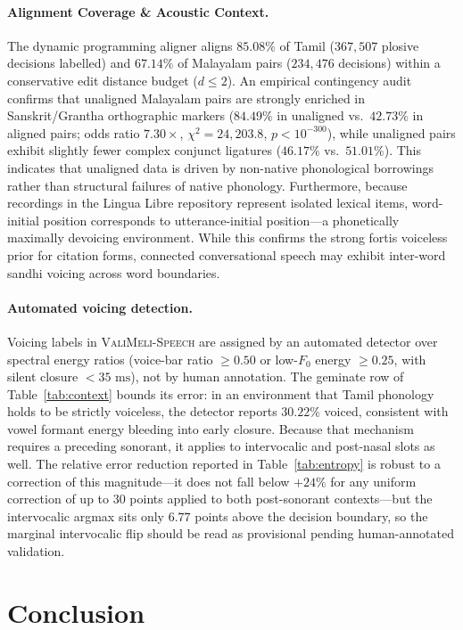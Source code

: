\documentclass[11pt]{article}
\begin{document}
\paragraph{Alignment Coverage \& Acoustic Context.} The dynamic programming aligner aligns $85.08\%$ of Tamil ($367{,}507$ plosive decisions labelled) and $67.14\%$ of Malayalam pairs ($234{,}476$ decisions) within a conservative edit distance budget ($d \le 2$). An empirical contingency audit confirms that unaligned Malayalam pairs are strongly enriched in Sanskrit/Grantha orthographic markers ($84.49\%$ in unaligned vs.\ $42.73\%$ in aligned pairs; odds ratio $7.30\times$, $\chi^2 = 24{,}203.8$, $p < 10^{-300}$), while unaligned pairs exhibit slightly fewer complex conjunct ligatures ($46.17\%$ vs.\ $51.01\%$). This indicates that unaligned data is driven by non-native phonological borrowings rather than structural failures of native phonology. Furthermore, because recordings in the Lingua Libre repository represent isolated lexical items, word-initial position corresponds to utterance-initial position---a phonetically maximally devoicing environment. While this confirms the strong fortis voiceless prior for citation forms, connected conversational speech may exhibit inter-word sandhi voicing across word boundaries.

\paragraph{Automated voicing detection.} Voicing labels in \textsc{ValiMeli-Speech} are assigned by an automated detector over spectral energy ratios (voice-bar ratio $\ge 0.50$ or low-$F_0$ energy $\ge 0.25$, with silent closure $< 35\text{ ms}$), not by human annotation. The geminate row of Table~\ref{tab:context} bounds its error: in an environment that Tamil phonology holds to be strictly voiceless, the detector reports $30.22\%$ voiced, consistent with vowel formant energy bleeding into early closure. Because that mechanism requires a preceding sonorant, it applies to intervocalic and post-nasal slots as well. The relative error reduction reported in Table~\ref{tab:entropy} is robust to a correction of this magnitude---it does not fall below $+24\%$ for any uniform correction of up to $30$ points applied to both post-sonorant contexts---but the intervocalic argmax sits only $6.77$ points above the decision boundary, so the marginal intervocalic flip should be read as provisional pending human-annotated validation.

\section{Conclusion}
\end{document}
